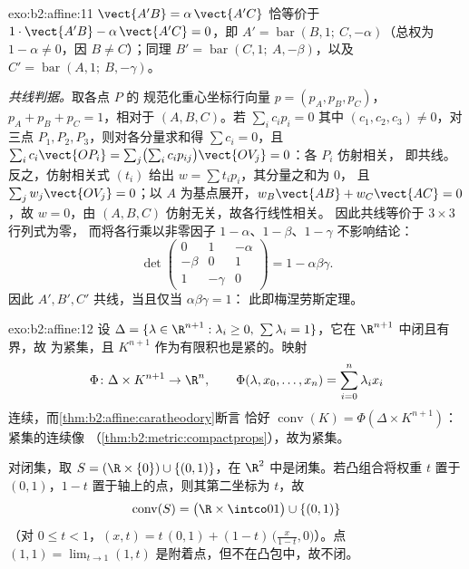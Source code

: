 \begin{solution}{exo:b2:affine:11}
$\vect{A'B} = \alpha\,\vect{A'C}$ 恰等价于 $1\cdot
\vect{A'B} - \alpha\,\vect{A'C} = 0$，即 $A' =
\operatorname{bar}(B, 1;\ C, -\alpha)$（总权为 $1 -
\alpha \neq 0$，因 $B \neq C$）；同理 $B' =
\operatorname{bar}(C, 1;\ A, -\beta)$，以及 $C' =
\operatorname{bar}(A, 1;\ B, -\gamma)$。

\emph{共线判据。}取各点 $P$ 的
规范化重心坐标行向量 $p = (p_A, p_B, p_C)$，$p_A + p_B +
p_C = 1$，相对于 $(A, B, C)$。若 $\sum_i c_i p_i = 0$
其中 $(c_1, c_2, c_3) \neq 0$，对三点 $P_1, P_2,
P_3$，则对各分量求和得 $\sum c_i = 0$，且
$\sum_i c_i \vect{OP_i} = \sum_j \bigl(\sum_i
c_ip_{ij}\bigr)\vect{OV_j} = 0$：各 $P_i$ 仿射相关，
即共线。反之，仿射相关式
$(t_i)$ 给出 $w = \sum t_ip_i$，其分量之和为 $0$，
且 $\sum_j w_j\vect{OV_j} = 0$；以 $A$ 为基点展开，$w_B
\vect{AB} + w_C\vect{AC} = 0$，故 $w = 0$，由
$(A, B, C)$ 仿射无关，故各行线性相关。
因此共线等价于 $3 \times 3$ 行列式为零，
而将各行乘以非零因子 $1 - \alpha$、$1 -
\beta$、$1 - \gamma$ 不影响结论：
\[
\det\begin{pmatrix} 0 & 1 & -\alpha\\ -\beta & 0 & 1\\ 1 &
-\gamma & 0\end{pmatrix}
= 1 - \alpha\beta\gamma .
\]
因此 $A', B', C'$ 共线，当且仅当 $\alpha\beta\gamma = 1$：
此即梅涅劳斯定理。
\end{solution}

\begin{solution}{exo:b2:affine:12}
设 $\Delta = \{\lambda \in \R^{n+1} : \lambda_i \geq 0,\
\sum\lambda_i = 1\}$，它在 $\R^{n+1}$ 中闭且有界，故
为紧集，且 $K^{n+1}$ 作为有限积也是紧的。映射
\[
\Phi \colon \Delta \times K^{n+1} \to \R^n, \qquad
\Phi(\lambda, x_0, \dots, x_n) = \sum_{i=0}^n \lambda_i x_i
\]
连续，而\cref{thm:b2:affine:caratheodory}断言
恰好 $\operatorname{conv}(K) = \Phi(\Delta \times
K^{n+1})$：紧集的连续像
（\cref{thm:b2:metric:compactprops}），故为紧集。

对闭集，取 $S = (\R \times \{0\}) \cup \{(0,
1)\}$，在 $\R^2$ 中是闭集。若凸组合将权重
$t$ 置于 $(0,1)$，$1 - t$ 置于轴上的点，则其第二坐标为
$t$，故
\[
\operatorname{conv}(S) = \bigl(\R \times \intco01\bigr) \cup
\{(0,1)\}
\]
（对 $0 \leq t < 1$，$(x, t) = t\,(0,1) + (1-t)\,\bigl(\tfrac
x{1-t}, 0\bigr)$）。点 $(1, 1) = \lim_{t \to 1}(1, t)$
是附着点，但不在凸包中，故不闭。
\end{solution}

